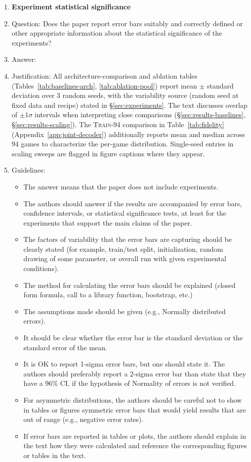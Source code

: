 \begin{enumerate}
\item {\bf Experiment statistical significance}
    \item[] Question: Does the paper report error bars suitably and correctly defined or other appropriate information about the statistical significance of the experiments?
    \item[] Answer: \answerYes{}
    \item[] Justification: All architecture-comparison and ablation tables (Tables~\ref{tab:baselines-arch}, \ref{tab:ablation-pool}) report mean $\pm$ standard deviation over 3 random seeds, with the variability source (random seed at fixed data and recipe) stated in \S\ref{sec:experiments}. The text discusses overlap of $\pm 1\sigma$ intervals when interpreting close comparisons (\S\ref{sec:results-baselines}, \S\ref{sec:results-scaling}). The \textsc{Train-94} comparison in Table~\ref{tab:fidelity} (Appendix~\ref{app:joint-decoder}) additionally reports mean and median across 94 games to characterize the per-game distribution. Single-seed entries in scaling sweeps are flagged in figure captions where they appear.
    \item[] Guidelines:
    \begin{itemize}
        \item The answer \answerNA{} means that the paper does not include experiments.
        \item The authors should answer \answerYes{} if the results are accompanied by error bars, confidence intervals, or statistical significance tests, at least for the experiments that support the main claims of the paper.
        \item The factors of variability that the error bars are capturing should be clearly stated (for example, train/test split, initialization, random drawing of some parameter, or overall run with given experimental conditions).
        \item The method for calculating the error bars should be explained (closed form formula, call to a library function, bootstrap, etc.)
        \item The assumptions made should be given (e.g., Normally distributed errors).
        \item It should be clear whether the error bar is the standard deviation or the standard error of the mean.
        \item It is OK to report 1-sigma error bars, but one should state it. The authors should preferably report a 2-sigma error bar than state that they have a 96\% CI, if the hypothesis of Normality of errors is not verified.
        \item For asymmetric distributions, the authors should be careful not to show in tables or figures symmetric error bars that would yield results that are out of range (e.g., negative error rates).
        \item If error bars are reported in tables or plots, the authors should explain in the text how they were calculated and reference the corresponding figures or tables in the text.
    \end{itemize}


\end{enumerate}
